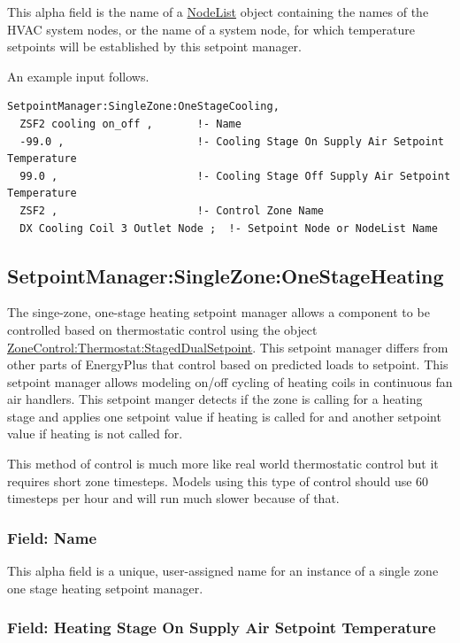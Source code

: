 This alpha field is the name of a \hyperref[nodelist]{NodeList} object containing the names of the HVAC system nodes, or the name of a system node, for which temperature setpoints will be established by this setpoint manager.

An example input follows.

\begin{lstlisting}
SetpointManager:SingleZone:OneStageCooling,
  ZSF2 cooling on_off ,       !- Name
  -99.0 ,                     !- Cooling Stage On Supply Air Setpoint Temperature
  99.0 ,                      !- Cooling Stage Off Supply Air Setpoint Temperature
  ZSF2 ,                      !- Control Zone Name
  DX Cooling Coil 3 Outlet Node ;  !- Setpoint Node or NodeList Name
\end{lstlisting}

\subsection{SetpointManager:SingleZone:OneStageHeating}\label{setpointmanagersinglezoneonestageheating}

The singe-zone, one-stage heating setpoint manager allows a component to be controlled based on thermostatic control using the object \hyperref[zonecontrolthermostatstageddualsetpoint]{ZoneControl:Thermostat:StagedDualSetpoint}. This setpoint manager differs from other parts of EnergyPlus that control based on predicted loads to setpoint. This setpoint manager allows modeling on/off cycling of heating coils in continuous fan air handlers. This setpoint manger detects if the zone is calling for a heating stage and applies one setpoint value if heating is called for and another setpoint value if heating is not called for.

This method of control is much more like real world thermostatic control but it requires short zone timesteps. Models using this type of control should use 60 timesteps per hour and will run much slower because of that.

\subsubsection{Field: Name}\label{field-name-26-001}

This alpha field is a unique, user-assigned name for an instance of a single zone one stage heating setpoint manager.

\subsubsection{Field: Heating Stage On Supply Air Setpoint Temperature}\label{field-heating-stage-on-supply-air-setpoint-temperature}

